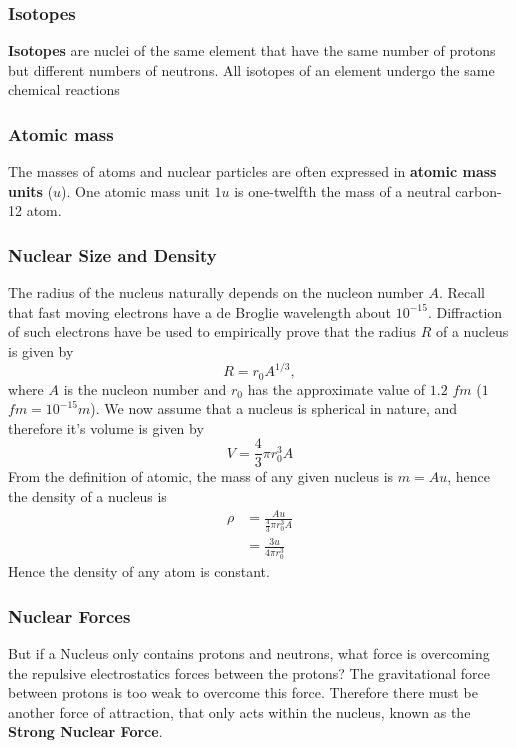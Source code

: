 \subsubsection*{Isotopes}

\textbf{Isotopes} are nuclei of the same element that have the same number of protons but different numbers of neutrons. All isotopes of an element undergo the same chemical reactions

\subsubsection*{Atomic mass}

The masses of atoms and nuclear particles are often expressed in \textbf{atomic mass units} ($u$). One atomic mass unit $1 u$ is one-twelfth the mass of a neutral carbon-12 atom. 

\subsubsection*{Nuclear Size and Density}

The radius of the nucleus naturally depends on the nucleon number $A$. Recall that fast moving electrons have a de Broglie wavelength about $10^{-15}$. Diffraction of such electrons have be used to empirically prove that the radius $R$ of a nucleus is given by 
\begin{equation}
    R = r_0 A^{1/3},
\end{equation}
where $A$ is the nucleon number and $r_0$ has the approximate value of $1.2$ $fm$ ($1$ $fm = 10^{-15}m$). We now assume that a nucleus is spherical in nature, and therefore it's volume is given by 
\begin{equation}
    V = \frac{4}{3} \pi r_0^3 A
\end{equation}
From the definition of atomic, the mass of any given nucleus is $m = Au$, hence the density of a nucleus is 
\begin{align}
    \rho &= \frac{Au}{\frac{4}{3} \pi r_0^3 A} \\
    &= \frac{3u}{4\pi r_0^3}
\end{align}
Hence the density of any atom is constant.

\subsubsection*{Nuclear Forces}

But if a Nucleus only contains protons and neutrons, what force is overcoming the repulsive electrostatics forces between the protons? The gravitational force between protons is too weak to overcome this force. Therefore there must be another force of attraction, that only acts within the nucleus, known as the \textbf{Strong Nuclear Force}.


